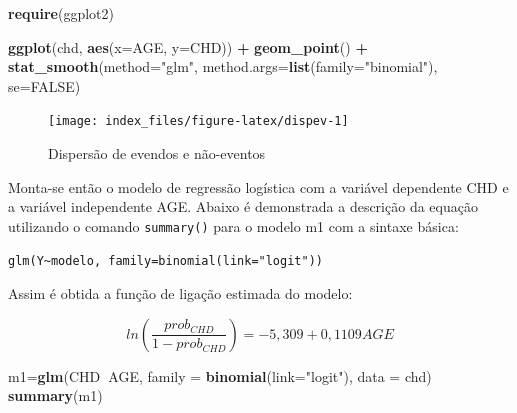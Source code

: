 \documentclass[12pt,brazil,oneside]{book}
\newenvironment{Shaded}{\begin{snugshade}}{\end{snugshade}}
\newcommand{\DataTypeTok}[1]{\textcolor[rgb]{0.13,0.29,0.53}{#1}}
\newcommand{\KeywordTok}[1]{\textcolor[rgb]{0.13,0.29,0.53}{\textbf{#1}}}
\newcommand{\NormalTok}[1]{#1}
\newcommand{\OperatorTok}[1]{\textcolor[rgb]{0.81,0.36,0.00}{\textbf{#1}}}
\newcommand{\OtherTok}[1]{\textcolor[rgb]{0.56,0.35,0.01}{#1}}
\newcommand{\StringTok}[1]{\textcolor[rgb]{0.31,0.60,0.02}{#1}}
\begin{document}
\begin{Shaded}
\begin{Highlighting}[]
\KeywordTok{require}\NormalTok{(ggplot2)}

\KeywordTok{ggplot}\NormalTok{(chd, }\KeywordTok{aes}\NormalTok{(}\DataTypeTok{x=}\NormalTok{AGE, }\DataTypeTok{y=}\NormalTok{CHD)) }\OperatorTok{+}\StringTok{ }
\StringTok{  }\KeywordTok{geom_point}\NormalTok{() }\OperatorTok{+}\StringTok{ }
\StringTok{  }\KeywordTok{stat_smooth}\NormalTok{(}\DataTypeTok{method=}\StringTok{"glm"}\NormalTok{, }\DataTypeTok{method.args=}\KeywordTok{list}\NormalTok{(}\DataTypeTok{family=}\StringTok{"binomial"}\NormalTok{), }\DataTypeTok{se=}\OtherTok{FALSE}\NormalTok{)}
\end{Highlighting}
\end{Shaded}

\begin{figure}[H]

{\centering \texttt{[image: index\_files/figure-latex/dispev-1]} 

}

\caption{Dispersão de evendos e não-eventos}\label{fig:dispev}
\end{figure}

Monta-se então o modelo de regressão logística com a variável dependente
CHD e a variável independente AGE. Abaixo é demonstrada a descrição da
equação utilizando o comando \texttt{summary()} para o modelo m1 com a
sintaxe básica:

\texttt{glm(Y\textasciitilde{}modelo,\ family=binomial(link="logit"))}

Assim é obtida a função de ligação estimada do modelo:

\[
ln\left (\frac{prob_{CHD}}{1-prob_{CHD}}  \right ) = - 5,309 + 0,1109AGE
\]

\begin{Shaded}
\begin{Highlighting}[]
\NormalTok{m1=}\KeywordTok{glm}\NormalTok{(CHD}\OperatorTok{~}\NormalTok{AGE, }\DataTypeTok{family =} \KeywordTok{binomial}\NormalTok{(}\DataTypeTok{link=}\StringTok{"logit"}\NormalTok{), }\DataTypeTok{data =}\NormalTok{ chd)}
\KeywordTok{summary}\NormalTok{(m1)}
\end{Highlighting}
\end{Shaded}
\end{document}
